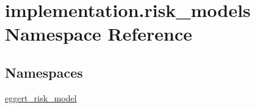 \hypertarget{namespaceimplementation_1_1risk__models}{}\section{implementation.\+risk\+\_\+models Namespace Reference}
\label{namespaceimplementation_1_1risk__models}
\subsection*{Namespaces}
\begin{DoxyCompactItemize}
\item 
 \hyperlink{namespaceimplementation_1_1risk__models_1_1eggert__risk__model}{eggert\+\_\+risk\+\_\+model}
\end{DoxyCompactItemize}
